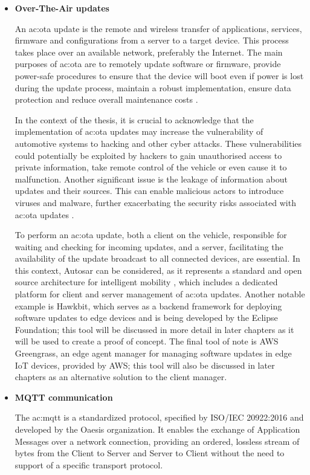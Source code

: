 \begin{itemize}
    \item \textbf{Over-The-Air updates}
    
    An \gls{ac:ota} update is the remote and wireless transfer of applications, services, firmware and configurations from a server to a target device. This process takes place over an available network, preferably the Internet. The main purposes of \gls{ac:ota} are to remotely update software or firmware, provide power-safe procedures to ensure that the device will boot even if power is lost during the update process, maintain a robust implementation, ensure data protection and reduce overall maintenance costs \cite{Open-sourceSWUpdate}.

    In the context of the thesis, it is crucial to acknowledge that the implementation of \gls{ac:ota} updates may increase the vulnerability of automotive systems to hacking and other cyber attacks. These vulnerabilities could potentially be exploited by hackers to gain unauthorised access to private information, take remote control of the vehicle or even cause it to malfunction. Another significant issue is the leakage of information about updates and their sources. This can enable malicious actors to introduce viruses and malware, further exacerbating the security risks associated with \gls{ac:ota} updates \cite{EnhancedMulti-LevelSecureUpdate}. 
    
    To perform an \gls{ac:ota} update, both a client on the vehicle, responsible for waiting and checking for incoming updates, and a server, facilitating the availability of the update broadcast to all connected devices, are essential. In this context, Autosar can be considered, as it represents a standard and open source architecture for intelligent mobility \cite{AutosarAbout}, which includes a dedicated platform for client and server management of \gls{ac:ota} updates. Another notable example is Hawkbit, which serves as a backend framework for deploying software updates to edge devices and is being developed by the Eclipse Foundation; this tool will be discussed in more detail in later chapters as it will be used to create a proof of concept. The final tool of note is AWS Greengrass, an edge agent manager for managing software updates in edge IoT devices, provided by AWS; this tool will also be discussed in later chapters as an alternative solution to the client manager.
    
    \item \textbf{MQTT communication}
    
    The \gls{ac:mqtt} is a standardized protocol, specified by ISO/IEC 20922:2016 and developed by the Oaesis organization. It enables the exchange of Application Messages over a network connection, providing an ordered, lossless stream of bytes from the Client to Server and Server to Client without the need to support of a specific transport protocol.


\end{itemize}
